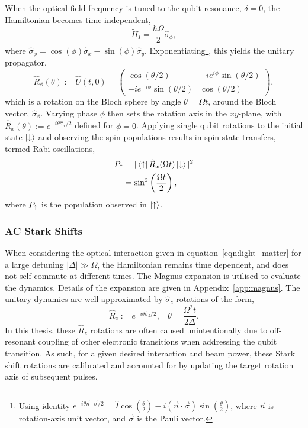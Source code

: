 When the optical field frequency is tuned to the qubit resonance, $\delta = 0$, the Hamiltonian becomes time-independent, 
\begin{equation}
\tilde H_I = \frac{\hbar\Omega}{2}\hat\sigma_\phi,
\end{equation}
where $\hat\sigma_\phi = \cos(\phi)\hat\sigma_x -\sin(\phi)\hat\sigma_y$.
Exponentiating\footnote{Using identity $e^{-i\theta \vec{n}\cdot\vec{\sigma}/2}
=\hat I \cos\left(\frac{\theta}{2}\right)-i(\vec{n}\cdot\vec{\sigma})\sin\left(\frac{\theta}{2}\right)$, where $\vec n$ is rotation-axis unit vector, and $\vec\sigma$ is the Pauli vector.}, this yields the unitary propagator,
\begin{equation}
    \hat R_\phi(\theta) := \hat U(t, 0) = \begin{pmatrix}
        \cos(\theta/2) & -ie^{i\phi}\sin(\theta/2) \\
        -ie^{-i\phi}\sin(\theta/2) & \cos(\theta/2) 
    \end{pmatrix},
\end{equation}
which is a rotation on the Bloch sphere by angle $\theta = \Omega t$, around the Bloch vector, $\hat\sigma_\phi$. Varying phase $\phi$ then sets the rotation axis in the $xy$-plane, with $\hat R_x(\theta):=e^{-i\theta\hat\sigma_x/2}$ defined for $\phi=0$. 
Applying single qubit rotations to the initial state $\ket{\downarrow}$ and observing the spin populations results in spin-state transfers, termed Rabi oscillations,
\begin{subequations}
\begin{align}
P_\uparrow &= |\bra{\uparrow}\hat R_x(\Omega t)\ket{\downarrow}|^2\\
&= \sin^2\left(\frac{\Omega t}{2}\right),
\end{align}
\end{subequations}
where $P_\uparrow$ is the population observed in $\ket{\uparrow}$.

\subsubsection{AC Stark Shifts}
\label{sec:ac_stark}

When considering the optical interaction given in
equation~\ref{eqn:light_matter} for a large detuning $|\Delta| \gg \Omega$, the
Hamiltonian remains time dependent, and does not self-commute at different
times. The Magnus expansion is utilised to evaluate the dynamics. Details of the expansion are given in Appendix~\ref{app:magnus}. The unitary dynamics are well approximated by $\hat\sigma_z$ rotations of the form,
\begin{equation}
\hat R_z := e^{-i\theta\hat\sigma_z/2}, ~~~~ \theta = \frac{\Omega^2t}{2\Delta}.
\end{equation}
In this thesis, these $\hat R_z$ rotations are often caused unintentionally due to
off-resonant coupling of other electronic transitions when addressing the qubit
transition. As such, for a given desired interaction and beam power, these Stark
shift rotations are calibrated and accounted for by updating the target rotation
axis of subsequent pulses.\\

